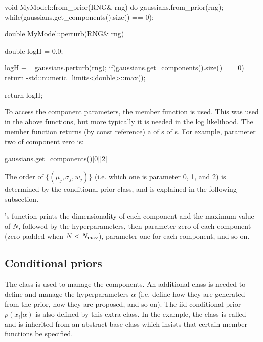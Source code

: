 \documentclass[article]{jss}
\begin{document}
\begin{CodeChunk}
\begin{CodeInput}
void MyModel::from_prior(RNG& rng)
{
    do
    {
        gaussians.from_prior(rng);
    }while(gaussians.get_components().size() == 0);
}

double MyModel::perturb(RNG& rng)
{
    double logH = 0.0;

    logH += gaussians.perturb(rng);
    if(gaussians.get_components().size() == 0)
        return -std::numeric_limits<double>::max();

    return logH;
}
\end{CodeInput}
\end{CodeChunk}

To access the component parameters, the  member function
 is used. This was used in the above functions, but more
typically it is needed in the log likelihood.
The member function  returns (by const reference) a
 of s of s. For example,
parameter two of component zero is:
\begin{CodeChunk}
\begin{CodeInput}
gaussians.get_components()[0][2]
\end{CodeInput}
\end{CodeChunk}
The order of $\{(\mu_j, \sigma_j, w_j)\}$
(i.e. which one is parameter 0, 1, and 2)
is determined by the conditional prior class, and is
explained in the following subsection.

's  function prints the dimensionality of each
component and the maximum value of $N$, followed by the hyperparameters,
then parameter zero of each component (zero padded when $N<N_{\rm max}$),
parameter one for each component, and so on.

\subsection{Conditional priors}
The  class is used to manage the components. An additional
class is needed to define and manage the hyperparameters $\alpha$ (i.e.
define how they are generated from the prior, how they are proposed, and
so on). The iid
conditional prior $p(x_i | \alpha)$ is also defined by this extra class.
In the example, the class is called  and
is inherited from an abstract base class 
which insists that certain member functions be specified.
\end{document}
